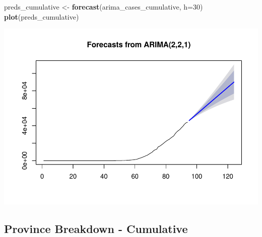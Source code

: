 \documentclass[]{article}
\newenvironment{Shaded}{\begin{snugshade}}{\end{snugshade}}
\newcommand{\DataTypeTok}[1]{\textcolor[rgb]{0.13,0.29,0.53}{#1}}
\newcommand{\DecValTok}[1]{\textcolor[rgb]{0.00,0.00,0.81}{#1}}
\newcommand{\KeywordTok}[1]{\textcolor[rgb]{0.13,0.29,0.53}{\textbf{#1}}}
\newcommand{\NormalTok}[1]{#1}
\newcommand{\StringTok}[1]{\textcolor[rgb]{0.31,0.60,0.02}{#1}}
\begin{document}
\begin{Shaded}
\begin{Highlighting}[]
\NormalTok{preds\_cumulative \textless{}{-}}\StringTok{ }\KeywordTok{forecast}\NormalTok{(arima\_cases\_cumulative, }\DataTypeTok{h=}\DecValTok{30}\NormalTok{)}
\KeywordTok{plot}\NormalTok{(preds\_cumulative)}
\end{Highlighting}
\end{Shaded}

\includegraphics{Covid19Canada_files/figure-latex/unnamed-chunk-6-1.pdf}

\hypertarget{province-breakdown---cumulative}{%
\subsection{Province Breakdown -
Cumulative}\label{province-breakdown---cumulative}}
\end{document}
